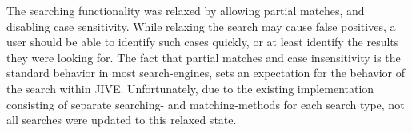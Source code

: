 The searching functionality was relaxed by allowing partial matches, and disabling case sensitivity.
While relaxing the search may cause false positives, a user should be able to identify such cases quickly, or at least identify the results they were looking for.
The fact that partial matches and case insensitivity is the standard behavior in most search-engines, sets an expectation for the behavior of the search within JIVE.
Unfortunately, due to the existing implementation consisting of separate searching- and matching-methods for each search type, not all searches were updated to this relaxed state.

